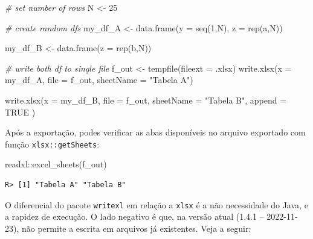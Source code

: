\documentclass[
  11pt,
]{book}
\newenvironment{Shaded}{\begin{snugshade}}{\end{snugshade}}
\newcommand{\AttributeTok}[1]{\textcolor[rgb]{0.61,0.61,0.61}{#1}}
\newcommand{\CommentTok}[1]{\textcolor[rgb]{0.37,0.37,0.37}{\textit{#1}}}
\newcommand{\ConstantTok}[1]{\textcolor[rgb]{0,0,0}{#1}}
\newcommand{\DecValTok}[1]{\textcolor[rgb]{0.06,0.06,0.06}{#1}}
\newcommand{\FunctionTok}[1]{\textcolor[rgb]{0,0,0}{#1}}
\newcommand{\NormalTok}[1]{#1}
\newcommand{\OtherTok}[1]{\textcolor[rgb]{0.37,0.37,0.37}{#1}}
\newcommand{\SpecialCharTok}[1]{\textcolor[rgb]{0,0,0}{#1}}
\newcommand{\StringTok}[1]{\textcolor[rgb]{0.5,0.5,0.5}{#1}}
\begin{document}
\begin{Shaded}
\begin{Highlighting}[]
\CommentTok{\# set number of rows}
\NormalTok{N }\OtherTok{\textless{}{-}} \DecValTok{25}

\CommentTok{\# create random dfs}
\NormalTok{my\_df\_A }\OtherTok{\textless{}{-}} \FunctionTok{data.frame}\NormalTok{(}\AttributeTok{y =} \FunctionTok{seq}\NormalTok{(}\DecValTok{1}\NormalTok{,N),}
                      \AttributeTok{z =} \FunctionTok{rep}\NormalTok{(}\StringTok{\textquotesingle{}a\textquotesingle{}}\NormalTok{,N))}

\NormalTok{my\_df\_B }\OtherTok{\textless{}{-}} \FunctionTok{data.frame}\NormalTok{(}\AttributeTok{z =} \FunctionTok{rep}\NormalTok{(}\StringTok{\textquotesingle{}b\textquotesingle{}}\NormalTok{,N))}

\CommentTok{\# write both df to single file}
\NormalTok{f\_out }\OtherTok{\textless{}{-}} \FunctionTok{tempfile}\NormalTok{(}\AttributeTok{fileext =} \StringTok{\textquotesingle{}.xlsx\textquotesingle{}}\NormalTok{)}
\FunctionTok{write.xlsx}\NormalTok{(}\AttributeTok{x =}\NormalTok{ my\_df\_A,}
           \AttributeTok{file =}\NormalTok{ f\_out,}
           \AttributeTok{sheetName =} \StringTok{"Tabela A"}\NormalTok{)}

\FunctionTok{write.xlsx}\NormalTok{(}\AttributeTok{x =}\NormalTok{ my\_df\_B,}
           \AttributeTok{file =}\NormalTok{ f\_out,}
           \AttributeTok{sheetName =} \StringTok{"Tabela B"}\NormalTok{,}
           \AttributeTok{append =} \ConstantTok{TRUE}\NormalTok{ )}
\end{Highlighting}
\end{Shaded}

Após a exportação, podes verificar as abas disponíveis no arquivo exportado com função \texttt{xlsx::getSheets}:

\begin{Shaded}
\begin{Highlighting}[]
\NormalTok{readxl}\SpecialCharTok{::}\FunctionTok{excel\_sheets}\NormalTok{(f\_out)}
\end{Highlighting}
\end{Shaded}

\begin{verbatim}
R> [1] "Tabela A" "Tabela B"
\end{verbatim}

O diferencial do pacote \texttt{writexl} em relação a \texttt{xlsx} é a não necessidade do Java, e a rapidez de execução. O lado negativo é que, na versão atual (1.4.1 -- 2022-11-23), não permite a escrita em arquivos já existentes. Veja a seguir: 
\end{document}
